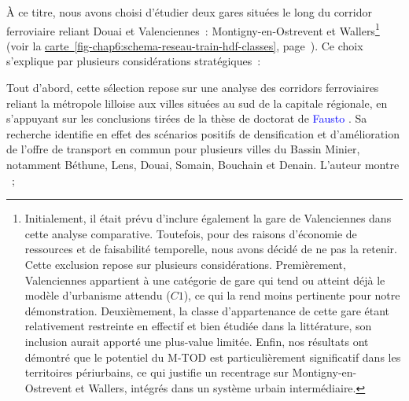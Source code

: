 \begin{refsegment}
À ce titre, nous avons choisi d'étudier deux gares situées le long du corridor ferroviaire reliant Douai et Valenciennes~: Montigny-en-Ostrevent et Wallers\footnote{
    Initialement, il était prévu d'inclure également la gare de Valenciennes dans cette analyse comparative. Toutefois, pour des raisons d'économie de ressources et de faisabilité temporelle, nous avons décidé de ne pas la retenir. Cette exclusion repose sur plusieurs considérations. Premièrement, Valenciennes appartient à une catégorie de gare qui tend ou atteint déjà le modèle d'urbanisme attendu (\(C1\)), ce qui la rend moins pertinente pour notre démonstration. Deuxièmement, la classe d'appartenance de cette gare étant relativement restreinte en effectif et bien étudiée dans la littérature, son inclusion aurait apporté une plus-value limitée. Enfin, nos résultats ont démontré que le potentiel du \acrshort{M-TOD} est particulièrement significatif dans les territoires périurbains, ce qui justifie un recentrage sur Montigny-en-Ostrevent et Wallers, intégrés dans un système urbain intermédiaire.
} (voir la \hyperref[fig-chap6:schema-reseau-train-hdf-classes]{carte~\ref{fig-chap6:schema-reseau-train-hdf-classes}}, page~\pageref{fig-chap6:schema-reseau-train-hdf-classes}). Ce choix s'explique par plusieurs considérations stratégiques~:
\begin{customitemize}
    \item Tout d'abord, cette sélection repose sur une analyse des corridors ferroviaires reliant la métropole lilloise aux villes situées au sud de la capitale régionale, en s'appuyant sur les conclusions tirées de la thèse de doctorat de \textcolor{blue}{Fausto} \textcolor{blue}{\textcite[246]{lo_feudo_scenario_2014}}. Sa recherche identifie en effet des scénarios positifs de densification et d'amélioration de l'offre de transport en commun pour plusieurs villes du Bassin Minier, notamment Béthune, Lens, Douai, Somain, Bouchain et Denain. L'auteur montre  \textcolor{blue}{\autocite[246]{lo_feudo_scenario_2014}}~;

\end{customitemize}
\end{refsegment}
